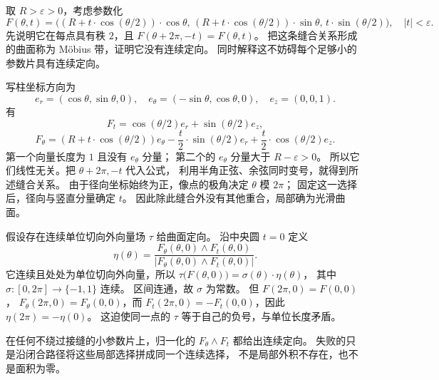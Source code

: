 \begin{exercise}\label{b1:ex:app-b-mobius-orientation}
取 \(R>\varepsilon>0\)，考虑参数化
\[
 F(\theta,t)=
 \bigl((R+t\cdot \cos(\theta/2))\cdot \cos\theta,\,
       (R+t\cdot \cos(\theta/2))\cdot \sin\theta,\,
       t\cdot \sin(\theta/2)\bigr),
 \quad |t|<\varepsilon.
\]
先说明它在每点具有秩 \(2\)，且
\(F(\theta+2\pi,-t)=F(\theta,t)\)。
把这条缝合关系形成的曲面称为 Möbius 带，证明它没有连续定向。
同时解释这不妨碍每个足够小的参数片具有连续定向。
\end{exercise}
\begin{solution}
写柱坐标方向为
\[
 e_r=(\cos\theta,\sin\theta,0),\quad
 e_\theta=(-\sin\theta,\cos\theta,0),\quad e_z=(0,0,1).
\]
有
\[
 F_t=\cos(\theta/2)e_r+\sin(\theta/2)e_z,
\]
\[
 F_\theta=(R+t\cdot \cos(\theta/2))e_\theta
      -\frac t2\cdot \sin(\theta/2)e_r
      +\frac t2\cdot \cos(\theta/2)e_z.
\]
第一个向量长度为 \(1\) 且没有 \(e_\theta\) 分量；
第二个的 \(e_\theta\) 分量大于 \(R-\varepsilon>0\)。
所以它们线性无关。把 \(\theta+2\pi,-t\) 代入公式，
利用半角正弦、余弦同时变号，就得到所述缝合关系。
由于径向坐标始终为正，像点的极角决定 \(\theta\) 模 \(2\pi\)；
固定这一选择后，径向与竖直分量确定 \(t\)。
因此除此缝合外没有其他重合，局部确为光滑曲面。

假设存在连续单位切向外向量场 \(\tau\) 给曲面定向。
沿中央圆 \(t=0\) 定义
\[
 \eta(\theta)=
 \frac{F_\theta(\theta,0)\wedge F_t(\theta,0)}
      {|F_\theta(\theta,0)\wedge F_t(\theta,0)|}.
\]
它连续且处处为单位切向外向量，所以
\(\tau\bigl(F(\theta,0)\bigr)=\sigma(\theta)\cdot\eta(\theta)\)，
其中 \(\sigma:[0,2\pi]\rightarrow\{-1,1\}\) 连续。
区间连通，故 \(\sigma\) 为常数。
但 \(F(2\pi,0)=F(0,0)\)，
\(F_\theta(2\pi,0)=F_\theta(0,0)\)，而
\(F_t(2\pi,0)=-F_t(0,0)\)，因此
\(\eta(2\pi)=-\eta(0)\)。
这迫使同一点的 \(\tau\) 等于自己的负号，与单位长度矛盾。

在任何不绕过接缝的小参数片上，归一化的 \(F_\theta\wedge F_t\) 都给出连续定向。
失败的只是沿闭合路径将这些局部选择拼成同一个连续选择，
不是局部外积不存在，也不是面积为零。
\end{solution}

